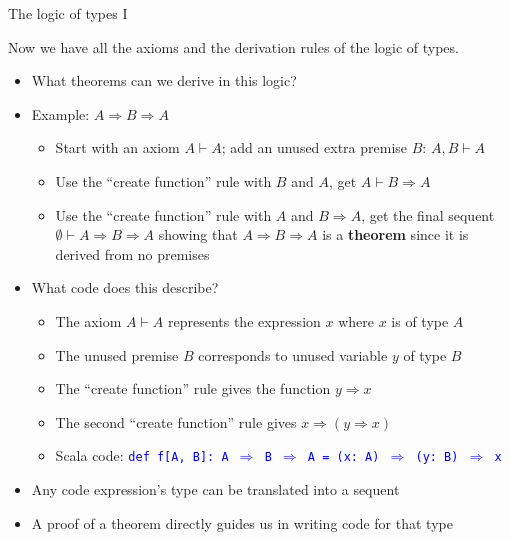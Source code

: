 \documentclass[english]{beamer}
\begin{document}
\begin{frame}{The logic of types I}

Now we have all the axioms and the derivation rules of the logic of
types.
\begin{itemize}
\item What theorems can we derive in this logic?
\item Example: $A\Rightarrow B\Rightarrow A$
\begin{itemize}
\item Start with an axiom $A\vdash A$; add an unused extra premise $B$:
$A,B\vdash A$
\item Use the ``create function'' rule with $B$ and $A$, get $A\vdash B\Rightarrow A$
\item Use the ``create function'' rule with $A$ and $B\Rightarrow A$,
get the final sequent $\emptyset\vdash A\Rightarrow B\Rightarrow A$
showing that $A\Rightarrow B\Rightarrow A$ is a \textbf{theorem}
since it is derived from no premises
\end{itemize}
\item What code does this describe?
\begin{itemize}
\item The axiom $A\vdash A$ represents the expression $x$ where $x$ is
of type $A$
\item The unused premise $B$ corresponds to unused variable $y$ of type
$B$
\item The ``create function'' rule gives the function $y\Rightarrow x$
\item The second ``create function'' rule gives $x\Rightarrow\left(y\Rightarrow x\right)$
\item Scala code: \texttt{\textcolor{blue}{\footnotesize{}def f{[}A, B{]}:\ A
$\Rightarrow$ B $\Rightarrow$ A = (x:\ A) $\Rightarrow$ (y:\ B)
$\Rightarrow$ x}}{\footnotesize \par}
\end{itemize}
\item Any code expression's type can be translated into a sequent
\item A proof of a theorem directly guides us in writing code for that type
\end{itemize}
\end{frame}
\end{document}
